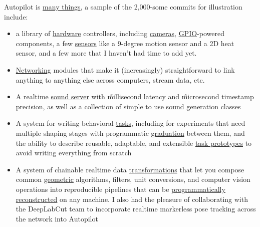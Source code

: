 \begin{done}
Autopilot is \href{https://docs.auto-pi-lot.com/en/latest/guide/overview.html}{many things}, a sample of the 2,000-some commits for illustration include: 
\begin{itemize}
\item a library of \href{https://docs.auto-pi-lot.com/en/latest/hardware/index.html}{hardware} controllers, including \href{https://docs.auto-pi-lot.com/en/latest/hardware/cameras.html}{cameras}, \href{https://docs.auto-pi-lot.com/en/latest/hardware/gpio.html}{GPIO}-powered components, a few \href{https://docs.auto-pi-lot.com/en/latest/hardware/i2c.html}{sensors} like a 9-degree motion sensor and a 2D heat sensor, and a few more that I haven't had time to add yet.
\item \href{https://docs.auto-pi-lot.com/en/latest/networking/index.html}{Networking} modules that make it (increasingly) straightforward to link anything to anything else across computers, stream data, etc.
\item A realtime \href{https://docs.auto-pi-lot.com/en/latest/stim/sound/jackclient.html}{sound server} with \~millisecond latency and \~microsecond timestamp precision, as well as a collection of simple to use \href{https://docs.auto-pi-lot.com/en/latest/stim/sound/sounds.html}{sound} generation classes
\item A system for writing behavioral \href{https://docs.auto-pi-lot.com/en/latest/guide/task.html}{tasks}, including for experiments that need multiple shaping stages with programmatic \href{https://docs.auto-pi-lot.com/en/latest/tasks/graduation.html}{graduation} between them, and the ability to describe reusable, adaptable, and extensible \href{https://docs.auto-pi-lot.com/en/latest/tasks/nafc.html}{task prototypes} to avoid writing everything from scratch
\item A system of chainable realtime data \href{https://docs.auto-pi-lot.com/en/latest/transform/index.html}{transformations} that let you compose common \href{https://docs.auto-pi-lot.com/en/latest/transform/geometry.html}{geometric} algorithms, filters, unit conversions, and computer vision operations into reproducible pipelines that can be \href{https://docs.auto-pi-lot.com/en/latest/transform/index.html#autopilot.transform.make_transform}{programmatically reconstructed} on any machine. I also had the pleasure of collaborating with the DeepLabCut\cite{mathisDeepLabCutMarkerlessPose2018} team to incorporate realtime markerless pose tracking across the network into Autopilot\cite{kaneRealtimeLowlatencyClosedloop2020}

\end{itemize}
\end{done}
